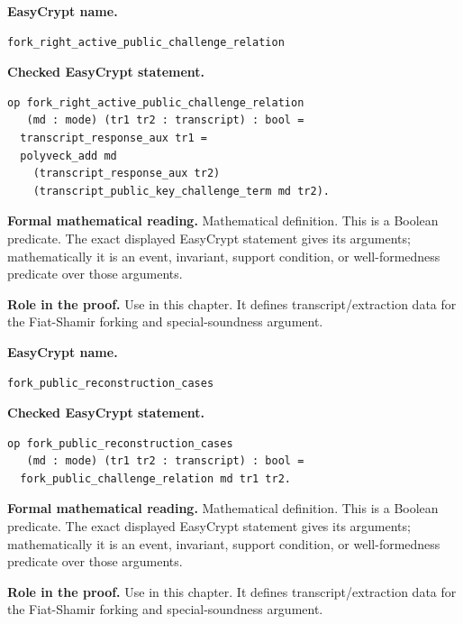 \begin{formaldefinition}
\noindent\textbf{EasyCrypt name.}
\begin{lstlisting}[language=EasyCrypt,basicstyle=\ttfamily\scriptsize]
fork_right_active_public_challenge_relation
\end{lstlisting}
\noindent\textbf{Checked EasyCrypt statement.}
\begin{lstlisting}[language=EasyCrypt,basicstyle=\ttfamily\scriptsize]
op fork_right_active_public_challenge_relation
   (md : mode) (tr1 tr2 : transcript) : bool =
  transcript_response_aux tr1 =
  polyveck_add md
    (transcript_response_aux tr2)
    (transcript_public_key_challenge_term md tr2).
\end{lstlisting}
\noindent\textbf{Formal mathematical reading.}
Mathematical definition. This is a Boolean predicate.  The exact displayed EasyCrypt statement gives its arguments; mathematically it is an event, invariant, support condition, or well-formedness predicate over those arguments.

\noindent\textbf{Role in the proof.}
Use in this chapter. It defines transcript/extraction data for the Fiat-Shamir forking and special-soundness argument.

\end{formaldefinition}

\begin{formaldefinition}
\noindent\textbf{EasyCrypt name.}
\begin{lstlisting}[language=EasyCrypt,basicstyle=\ttfamily\scriptsize]
fork_public_reconstruction_cases
\end{lstlisting}
\noindent\textbf{Checked EasyCrypt statement.}
\begin{lstlisting}[language=EasyCrypt,basicstyle=\ttfamily\scriptsize]
op fork_public_reconstruction_cases
   (md : mode) (tr1 tr2 : transcript) : bool =
  fork_public_challenge_relation md tr1 tr2.
\end{lstlisting}
\noindent\textbf{Formal mathematical reading.}
Mathematical definition. This is a Boolean predicate.  The exact displayed EasyCrypt statement gives its arguments; mathematically it is an event, invariant, support condition, or well-formedness predicate over those arguments.

\noindent\textbf{Role in the proof.}
Use in this chapter. It defines transcript/extraction data for the Fiat-Shamir forking and special-soundness argument.

\end{formaldefinition}

